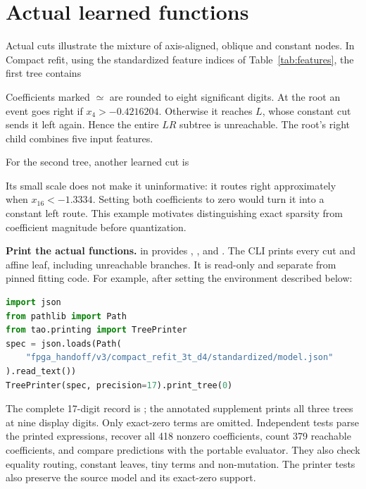 \section{Actual learned functions}
\label{sec:example}
Actual cuts illustrate the mixture of axis-aligned, oblique and constant
nodes. In Compact refit, using the standardized feature indices of
Table~\ref{tab:features}, the first tree contains

Coefficients marked $\simeq$ are rounded to eight significant digits. At the
root an event goes right if $x_4>-0.4216204$. Otherwise it reaches $L$, whose
constant cut sends it left again. Hence the entire $LR$ subtree is
unreachable. The root's right child combines five input features.

For the second tree, another learned cut is

Its small scale does not make it uninformative: it routes right approximately
when $x_{16}<-1.3334$. Setting both coefficients to zero would turn it into a
constant left route. This example motivates distinguishing exact sparsity
from coefficient magnitude before quantization.

\begin{implementation}
\textbf{Print the actual functions.}  in
 provides , ,
 and . The CLI
 prints every cut and affine leaf, including
unreachable branches. It is read-only and separate from pinned fitting code.
For example, after setting the environment described below:
\begin{lstlisting}[language=Python]
import json
from pathlib import Path
from tao.printing import TreePrinter
spec = json.loads(Path(
    "fpga_handoff/v3/compact_refit_3t_d4/standardized/model.json"
).read_text())
TreePrinter(spec, precision=17).print_tree(0)
\end{lstlisting}
The complete 17-digit record is
; the annotated supplement
prints all three trees at nine display digits. Only exact-zero terms are
omitted. Independent tests parse the printed expressions, recover all 418
nonzero coefficients, count 379 reachable coefficients, and compare predictions
with the portable evaluator. They also check equality routing, constant leaves,
tiny terms and non-mutation. The printer tests also preserve the source model and its exact-zero support.
\end{implementation}
